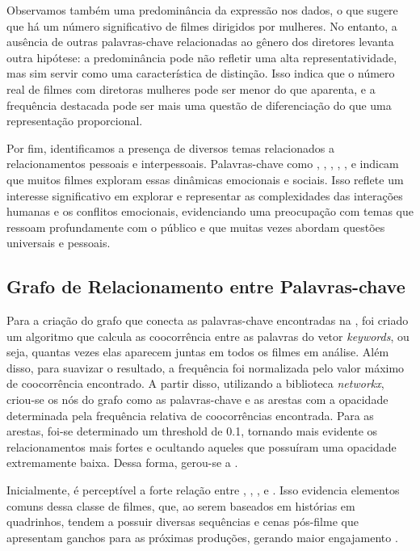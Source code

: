 Observamos também uma predominância da expressão  nos dados, o que sugere que há um número significativo de filmes dirigidos por mulheres. No entanto, a ausência de outras palavras-chave relacionadas ao gênero dos diretores levanta outra hipótese: a predominância pode não refletir uma alta representatividade, mas sim servir como uma característica de distinção. Isso indica que o número real de filmes com diretoras mulheres pode ser menor do que aparenta, e a frequência destacada pode ser mais uma questão de diferenciação do que uma representação proporcional.

Por fim, identificamos a presença de diversos temas relacionados a relacionamentos pessoais e interpessoais. Palavras-chave como , , , , ,  e  indicam que muitos filmes exploram essas dinâmicas emocionais e sociais. Isso reflete um interesse significativo em explorar e representar as complexidades das interações humanas e os conflitos emocionais, evidenciando uma preocupação com temas que ressoam profundamente com o público e que muitas vezes abordam questões universais e pessoais.

\subsection{Grafo de Relacionamento entre Palavras-chave}
Para a criação do grafo que conecta as palavras-chave encontradas na , foi criado um algoritmo que calcula as coocorrência entre as palavras do vetor \textit{keywords}, ou seja, quantas vezes elas aparecem juntas em todos os filmes em análise. Além disso, para suavizar o resultado, a frequência foi normalizada pelo valor máximo de coocorrência encontrado. A partir disso, utilizando a biblioteca \textit{networkx}\cite{networkx}, criou-se os nós do grafo como as palavras-chave e as arestas com a opacidade determinada pela frequência relativa de coocorrências encontrada. Para as arestas, foi-se determinado um threshold de 0.1, tornando mais evidente os relacionamentos mais fortes e ocultando aqueles que possuíram uma opacidade extremamente baixa. Dessa forma, gerou-se a .

%

Inicialmente, é perceptível a forte relação entre , , ,  e . Isso evidencia elementos comuns dessa classe de filmes, que, ao serem baseados em histórias em quadrinhos, tendem a possuir diversas sequências e cenas pós-filme que apresentam ganchos para as próximas produções, gerando maior engajamento \cite{riseofthepostcredits}.

